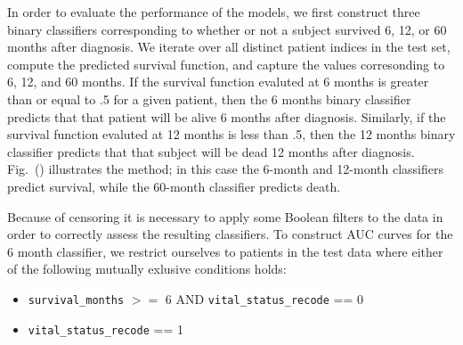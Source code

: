 \documentclass[10pt,letterpaper]{article}
\newcommand{\codewhite}[1]{\colorbox{white}{\texttt{#1}}}
\begin{document}
In order to evaluate the performance of the models, we first construct three binary classifiers corresponding to whether or not a subject survived 6, 12, or 60 months after diagnosis. 
We iterate over all distinct patient indices in the test set, compute the predicted survival function, and capture the values corresonding to 6, 12, and 60 months.  
If the survival function evaluted at 6 months is greater than or equal to .5 for a given patient, then the 6 months binary classifier predicts that that patient will be alive 6 months after diagnosis. Similarly, if the survival function evaluted at 12 months is less than .5, then the 12 months binary classifier predicts that that subject will be dead 12 months after diagnosis. Fig.~() illustrates the method; in this case the 6-month and 12-month classifiers predict survival, while the 60-month classifier predicts death.





Because of censoring it is necessary to apply some Boolean filters to the data in order to correctly assess the resulting classifiers.
To construct AUC curves for the 6 month classifier, we restrict ourselves to 
patients in the test data where either of the following mutually exlusive conditions holds:

\begin{itemize}[noitemsep]
\item \codewhite{survival\_months} $>=$ 6 AND \codewhite{vital\_status\_recode} == 0
\item \codewhite{vital\_status\_recode} == 1
\end{itemize}
\end{document}
